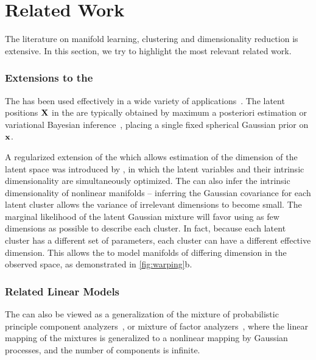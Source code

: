 \section{Related Work}
\label{sec:iwmm-related-work}

The literature on manifold learning, clustering and dimensionality reduction is extensive.
In this section, we try to highlight the most relevant related work.

\subsubsection{Extensions to the \sgplvm{}}

The \gplvm{} has been used effectively in a wide variety of applications~\citep{lawrence2004gaussian,salzmann2008local,lawrence2009non}.
The latent positions $\mathbf{X}$ in the \gplvm{} are typically obtained by maximum a posteriori estimation or variational Bayesian inference~\citep{titsias2010bayesian}, placing a single fixed spherical Gaussian prior on ${\bf{x}}$.

A regularized extension of the \gplvm{} which allows estimation of the dimension of the latent space was introduced by \citet{geiger2009rank}, in which the latent variables and their intrinsic dimensionality are simultaneously optimized.
The \iwmm{} can also infer the intrinsic dimensionality of nonlinear manifolds -- inferring the Gaussian covariance for each latent cluster allows the variance of irrelevant dimensions to become small.
The marginal likelihood of the latent Gaussian mixture will favor using as few dimensions as possible to describe each cluster.
In fact, because each latent cluster has a different set of parameters, each cluster can have a different effective dimension.
This allows the \iwmm{} to model manifolds of differing dimension in the observed space, as demonstrated in \cref{fig:warping}{b}.

\subsubsection{Related Linear Models}

The \iwmm{} can also be viewed as a generalization of the mixture of probabilistic principle component analyzers~\citep{tipping1999mixtures}, or mixture of factor analyzers~\citep{ghahramani2000variational}, where the linear mapping of the mixtures is generalized to a nonlinear mapping by Gaussian processes, and the number of components is infinite.%

